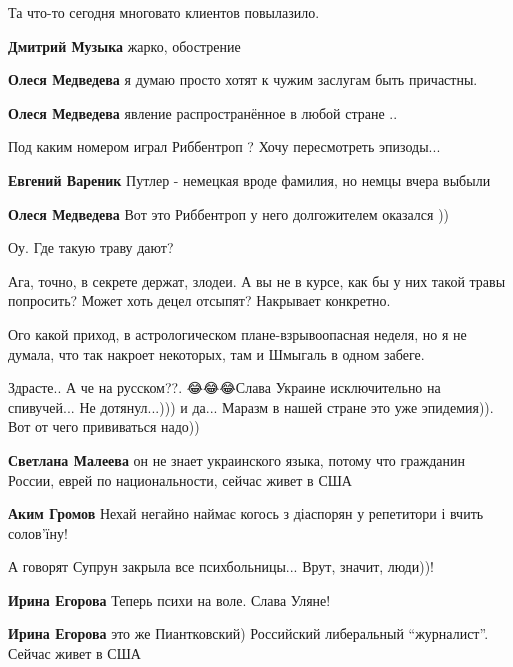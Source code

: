 \begin{itemize}
Та что-то сегодня многовато клиентов повылазило.

\textbf{Дмитрий Музыка} жарко, обострение

\textbf{Олеся Медведева} я думаю просто хотят к чужим заслугам быть причастны.

\textbf{Олеся Медведева}
явление распространённое в любой стране ..

Под каким номером играл Риббентроп ?
Хочу пересмотреть эпизоды...

\textbf{Евгений Вареник} Путлер - немецкая вроде фамилия, но немцы вчера выбыли

\textbf{Олеся Медведева} Вот это Риббентроп у него долгожителем оказался ))

Оу. Где такую траву дают?


Ага, точно, в секрете держат, злодеи. А вы не в курсе, как бы у них такой травы
попросить? Может хоть децел отсыпят? Накрывает конкретно.

Ого какой приход, в астрологическом плане-взрывоопасная неделя, но я не думала,
что так накроет некоторых, там и Шмыгаль в одном забеге.


Здрасте.. А че на русском??. 😂😂😂Слава Украине исключительно на спивучей...
Не дотянул...))) и да... Маразм в нашей стране это уже эпидемия)). Вот от чего
прививаться надо))


\textbf{Светлана Малеева} он не знает украинского языка, потому что гражданин
России, еврей по национальности, сейчас живет в США


\textbf{Аким Громов} Нехай негайно наймає когось з діаспорян у репетитори і вчить солов'їну!

А говорят Супрун закрыла все психбольницы... Врут, значит, люди))!

\textbf{Ирина Егорова} Теперь психи на воле. Слава Уляне!

\textbf{Ирина Егорова} это же Пиантковский) Российский либеральный \enquote{журналист}. Сейчас живет в США


\end{itemize}
